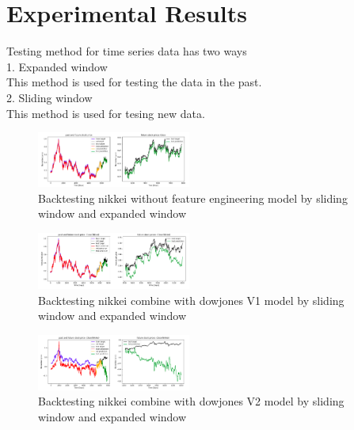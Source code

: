 \documentclass{article}
\begin{document}
\section{Experimental Results}
Testing method for time series data has two ways\\

1. Expanded window\\

This method is used for testing the data in the past.\\

2. Sliding window\\

This method is used for tesing new data.\\



\label{sec:exp}
\label{sec:latex}
\begin{figure}
  \centering
  \centerline{\includegraphics[width=0.45\textwidth]{test1.png}}
  \caption{Backtesting nikkei without feature engineering model by sliding window and expanded window}
  \label{fig:bibtex}
\end{figure}

\label{sec:latex}
\begin{figure}
  \centering
  \centerline{\includegraphics[width=0.45\textwidth]{test2.png}}
  \caption{Backtesting nikkei combine with dowjones V1 model by sliding window and expanded window}
  \label{fig:bibtex}
\end{figure}

\label{sec:latex}
\begin{figure}
  \centering
  \centerline{\includegraphics[width=0.45\textwidth]{test3.png}}
  \caption{Backtesting nikkei combine with dowjones V2 model by sliding window and expanded window}
  \label{fig:bibtex}
\end{figure}
\end{document}
